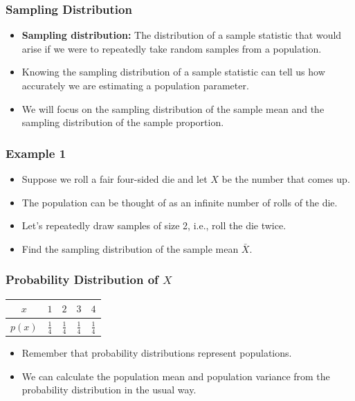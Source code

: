 \documentclass[12pt]{beamer}
\begin{document}
\begin{frame}
	\frametitle{Sampling Distribution}
	
	\begin{itemize}[label={\color{blue}$\blacktriangleright$}]
		\item {\bf Sampling distribution:} The distribution of a sample statistic that would arise if we were to repeatedly take random samples from a population.
		\item {\color{red}Knowing the sampling distribution of a sample statistic can tell us how accurately we are estimating a population parameter.}
		\item We will focus on the sampling distribution of the sample mean and the sampling distribution of the sample proportion.
	\end{itemize}
	
\end{frame}

\begin{frame}
	\frametitle{Example 1}
	
	\begin{itemize}[label={\color{blue}$\blacktriangleright$}]
		\item Suppose we roll a fair four-sided die and let $X$ be the number that comes up.
		\item The population can be thought of as an infinite number of rolls of the die.
		\item Let's repeatedly draw samples of size 2, i.e., roll the die twice.
		\item Find the sampling distribution of the sample mean $\bar{X}$.
	\end{itemize}
	
\end{frame}
\begin{frame}
	\frametitle{Probability Distribution of $X$}
	\begin{center}
	\begin{tabular}{ccccc}
		\toprule
		$x$&$1$&$2$&$3$&$4$\\
		\midrule
		$p(x)$&$\frac{1}{4}$&$\frac{1}{4}$&$\frac{1}{4}$&$\frac{1}{4}$\\
		\bottomrule
	\end{tabular}
\end{center}
\begin{itemize}[label={\color{blue}$\blacktriangleright$}]
	\item Remember that probability distributions represent populations.
	\item We can calculate the population mean and population variance from the probability distribution in the usual way.
\end{itemize}
\end{frame}
\end{document}
